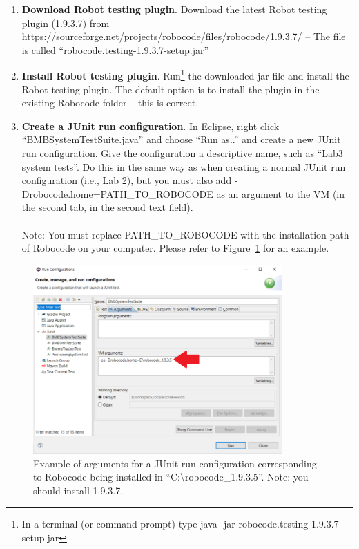 \documentclass{scrreprt}
\begin{document}
\begin{enumerate}
\item \textbf{Download Robot testing plugin}. Download the latest Robot testing plugin (1.9.3.7) from https://sourceforge.net/projects/robocode/files/robocode/1.9.3.7/ -- The file is called ``robocode.testing-1.9.3.7-setup.jar''
\item \textbf{Install Robot testing plugin}. Run\footnote{In a terminal (or command prompt) type java -jar robocode.testing-1.9.3.7-setup.jar} the downloaded jar file and 
install the Robot testing plugin. The default option is to install the plugin in the existing Robocode folder -- this is correct.
\item \textbf{Create a JUnit run configuration}. In Eclipse, right click ``BMBSystemTestSuite.java'' and choose ``Run as..'' and create a new JUnit run configuration. Give the configuration a descriptive name, such as ``Lab3 system tests''. Do this in the same way as when creating a normal JUnit run configuration (i.e., Lab 2), but you must also add -Drobocode.home=PATH\_TO\_ROBOCODE as an argument to the VM (in the second tab, in the second text field).\\\\Note: You must replace PATH\_TO\_ROBOCODE with the installation path of Robocode on your computer. Please refer to Figure~\ref{fig:runConfig} for an example.
\end{enumerate}

\begin{figure}
\centering
\includegraphics[width=0.85\textwidth]{figures/runConfig.png}
\caption{Example of arguments for a JUnit run configuration corresponding to Robocode being installed in ``C:\textbackslash robocode\_1.9.3.5''. Note: you should install 1.9.3.7.}
\label{fig:runConfig}
\end{figure}
\end{document}
